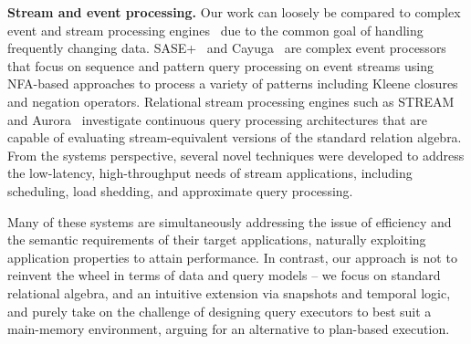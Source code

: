 
\noindent \textbf{Stream and event processing.}
Our work can loosely be compared to complex event and stream processing
engines~\cite{wu-sigmod:06,agrawal-sigmod:08,white-pods:07,motwani-cidr:03,abadi-vldbj:03}
due to the common goal of handling frequently changing data.
SASE+~\cite{agrawal-sigmod:08} and Cayuga~\cite{white-pods:07} are complex event
processors that focus on sequence and pattern query processing on event streams
using NFA-based approaches to process a variety of patterns including Kleene
closures and negation operators. Relational stream processing engines such as
STREAM~\cite{motwani-cidr:03} and Aurora~\cite{abadi-vldbj:03} investigate
continuous query processing architectures that are capable of evaluating
stream-equivalent versions of the standard relation algebra. From the systems
perspective, several novel techniques were developed to address the low-latency,
high-throughput needs of stream applications, including scheduling, load
shedding, and approximate query processing.

Many of these systems are simultaneously addressing the issue of efficiency and
the semantic requirements of their target applications, naturally exploiting
application properties to attain performance. In contrast, our approach is not to
reinvent the wheel in terms of data and query models -- we focus on standard
relational algebra, and an intuitive extension via snapshots and temporal logic,
and purely take on the challenge of designing query executors to best suit a
main-memory environment, arguing for an alternative to plan-based execution.



